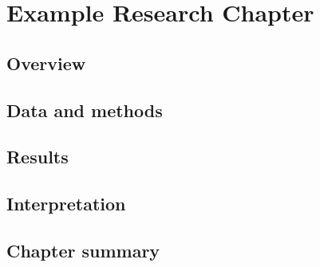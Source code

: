 \chapteropen
\chapter{Example Research Chapter}\label{ch:chapter2}
\hypertarget{ch:chapter2}{}
\glsresetall
\quoteTwo

%

\section{Overview}
\section{Data and methods}
\section{Results}
\section{Interpretation}
\section{Chapter summary}

    
